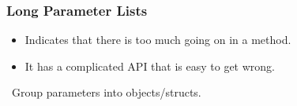 \begin{frame}

\frametitle{Long Parameter Lists}

\begin{itemize}

\item Indicates that there is too much going on in a method.

\item It has a complicated API that is easy to get wrong.

\end{itemize}

\vspace{\fill}

\begin{center}

\leftthumbsup~Group parameters into objects/structs.~\rightthumbsup

\end{center}

\vspace{\fill}

\end{frame}
